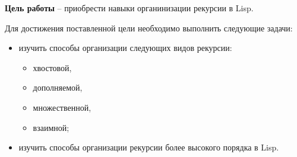 \Introduction

\textbf{Цель работы} -- приобрести навыки органинизации рекурсии в Lisp.

Для достижения поставленной цели необходимо выполнить следующие задачи:

\begin{itemize}[$\bullet$]
	\item изучить способы организации следующих видов рекурсии:

	\begin{itemize}[$\circ$]
		\item хвостовой,
		\item дополняемой,
		\item множественной,
		\item взаимной;
	\end{itemize}
	
	 \item изучить способы организации рекурсии более высокого порядка в Lisp.
\end{itemize}
